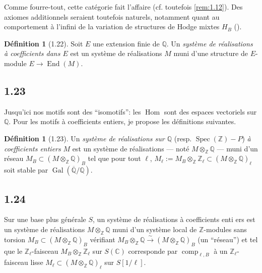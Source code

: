 \documentclass[12pt,a4paper]{article}
\theoremstyle{plain}
\theoremstyle{definition}
\newtheorem{definition}[theorem]{D\'efinition}
\theoremstyle{remark}
\DeclareMathOperator{\Spec}{Spec}
\DeclareMathOperator{\Hom}{Hom}
\DeclareMathOperator{\End}{End}
\DeclareMathOperator{\Gal}{Gal}
\providecommand{\Hom}{\operatorname{Hom}}
\providecommand{\End}{\operatorname{End}}
\providecommand{\Gal}{\operatorname{Gal}}
\providecommand{\Spec}{\operatorname{Spec}}
\providecommand{\comp}{\operatorname{comp}}
\begin{document}
Comme fourre-tout, cette cat\'egorie fait l'affaire (cf. toutefois \ref{rem:1.12}). Des
axiomes additionnels seraient toutefois naturels, notamment quant au comportement \`a
l'infini de la variation de structures de Hodge mixtes $H_B$ (\cite{SZ}).

\begin{definition}[1.22]\label{def:1.22}
Soit $E$ une extension finie de $\mathbb{Q}$. Un \emph{syst\`eme de r\'ealisations \`a
coefficients dans $E$} est un syst\`eme de r\'ealisations $M$ muni d'une structure de
$E$-module $E \to \End(M)$.
\end{definition}

\subsection*{1.23}

Jusqu'ici nos motifs sont des ``isomotifs'': les $\Hom$ sont des espaces vectoriels sur
$\mathbb{Q}$. Pour les motifs \`a coefficients entiers, je propose les d\'efinitions
suivantes.

\begin{definition}[1.23]\label{def:1.23}
Un \emph{syst\`eme de r\'ealisations sur $\mathbb{Q}$} (resp.
$\Spec(\mathbb{Z}) - P$) \emph{\`a coefficients entiers} $M$ est un syst\`eme de
r\'ealisations --- not\'e $M \otimes_{\mathbb{Z}} \mathbb{Q}$ --- muni d'un r\'eseau
$M_B \subset (M \otimes_{\mathbb{Z}} \mathbb{Q})_B$ tel que pour tout $\ell$,
$M_\ell := M_B \otimes_{\mathbb{Z}} \mathbb{Z}_\ell \subset (M \otimes_{\mathbb{Z}}
\mathbb{Q})_\ell$ soit stable par $\Gal(\overline{\mathbb{Q}}/\mathbb{Q})$.
\end{definition}

\subsection*{1.24}

Sur une base plus g\'en\'erale $S$, un syst\`eme de r\'ealisations \`a coefficients
enti ers est un syst\`eme de r\'ealisations $M \otimes_{\mathbb{Z}} \mathbb{Q}$ muni d'un
syst\`eme local de $\mathbb{Z}$-modules sans torsion $M_B \subset (M \otimes_{\mathbb{Z}}
\mathbb{Q})_B$ v\'erifiant $M_B \otimes_{\mathbb{Z}} \mathbb{Q} \xrightarrow{\sim} (M
\otimes_{\mathbb{Z}} \mathbb{Q})_B$ (un ``r\'eseau'') et tel que le
$\mathbb{Z}_\ell$-faisceau $M_B \otimes_{\mathbb{Z}} \mathbb{Z}_\ell$ sur $S(\mathbb{C})$
corresponde par $\comp_{\ell,B}$ \`a un $\mathbb{Z}_\ell$-faisceau lisse $M_\ell \subset
(M \otimes_{\mathbb{Z}} \mathbb{Q})_\ell$ sur $S[1/\ell]$.
\end{document}
